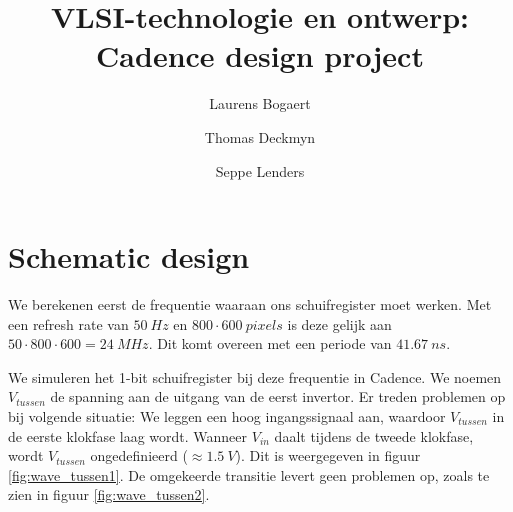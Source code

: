 \documentclass[11pt,a4paper,oneside,dutch]{article}
\author{Laurens Bogaert \and Thomas Deckmyn \and Seppe Lenders}
\title{VLSI-technologie en ontwerp: Cadence design project}
\date{\vspace{-5ex}} %
\begin{document}
\maketitle{}

\section{Schematic design}

We berekenen eerst de frequentie waaraan ons schuifregister moet werken. Met een refresh rate van $\SI{50}{Hz}$ en $800 \cdot \SI{600}{pixels}$ is deze gelijk aan $50 \cdot 800 \cdot 600 = \SI{24}{MHz}$. Dit komt overeen met een periode van $\SI{41,67}{ns}$.

We simuleren het 1-bit schuifregister bij deze frequentie in Cadence. We noemen $V_{tussen}$ de spanning aan de uitgang van de eerst invertor. Er treden problemen op bij volgende situatie: We leggen een hoog ingangssignaal aan, waardoor $V_{tussen}$ in de eerste klokfase laag wordt. Wanneer $V_{in}$ daalt tijdens de tweede klokfase, wordt $V_{tussen}$ ongedefinieerd ($\approx \SI{1,5}{V}$). Dit is weergegeven in figuur \ref{fig:wave_tussen1}. De omgekeerde transitie levert geen problemen op, zoals te zien in figuur \ref{fig:wave_tussen2}.
\end{document}
